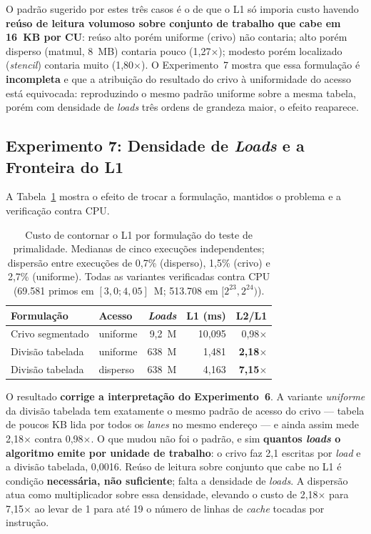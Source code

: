 O padrão sugerido por estes três casos é o de que o L1 só imporia custo havendo \textbf{reúso de leitura volumoso sobre conjunto de trabalho que cabe em 16~KB por CU}: reúso alto porém uniforme (crivo) não contaria; alto porém disperso (matmul, 8~MB) contaria pouco (1,27$\times$); modesto porém localizado (\textit{stencil}) contaria muito (1,80$\times$). O Experimento~7 mostra que essa formulação é \textbf{incompleta} e que a atribuição do resultado do crivo à uniformidade do acesso está equivocada: reproduzindo o mesmo padrão uniforme sobre a mesma tabela, porém com densidade de \textit{loads} três ordens de grandeza maior, o efeito reaparece.


\subsection{Experimento 7: Densidade de \textit{Loads} e a Fronteira do L1}
\label{sec:densidade}

A Tabela~\ref{tab:densidade} mostra o efeito de trocar a formulação, mantidos o problema e a verificação contra CPU.

\begin{table}[ht]
\centering
\caption{Custo de contornar o L1 por formulação do teste de primalidade. Medianas de cinco execuções independentes; dispersão entre execuções de 0,7\% (disperso), 1,5\% (crivo) e 2,7\% (uniforme). Todas as variantes verificadas contra CPU (69.581 primos em $[3{,}0;4{,}05]$~M; 513.708 em $[2^{23},2^{24})$).}
\label{tab:densidade}
\small
\begin{tabular}{@{}llrrr@{}}
\toprule
\textbf{Formulação} & \textbf{Acesso} & \textbf{\textit{Loads}} & \textbf{L1 (ms)} & \textbf{L2/L1} \\
\midrule
Crivo segmentado & uniforme & 9,2~M & 10,095 & 0,98$\times$ \\
Divisão tabelada & uniforme & 638~M & 1,481 & \textbf{2,18$\times$} \\
Divisão tabelada & disperso & 638~M & 4,163 & \textbf{7,15$\times$} \\
\bottomrule
\end{tabular}
\end{table}

O resultado \textbf{corrige a interpretação do Experimento~6}. A variante \textit{uniforme} da divisão tabelada tem exatamente o mesmo padrão de acesso do crivo --- tabela de poucos KB lida por todos os \textit{lanes} no mesmo endereço --- e ainda assim mede 2,18$\times$ contra 0,98$\times$. O que mudou não foi o padrão, e sim \textbf{quantos \textit{loads} o algoritmo emite por unidade de trabalho}: o crivo faz 2,1 escritas por \textit{load} e a divisão tabelada, 0,0016. Reúso de leitura sobre conjunto que cabe no L1 é condição \textbf{necessária, não suficiente}; falta a densidade de \textit{loads}. A dispersão atua como multiplicador sobre essa densidade, elevando o custo de 2,18$\times$ para 7,15$\times$ ao levar de 1 para até 19 o número de linhas de \textit{cache} tocadas por instrução.

